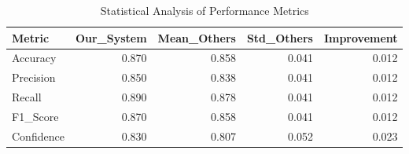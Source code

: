 \begin{table}
\caption{Statistical Analysis of Performance Metrics}
\label{tab:statistical_analysis}
\begin{tabular}{lrrrr}
\toprule
Metric & Our_System & Mean_Others & Std_Others & Improvement \\
\midrule
Accuracy & 0.870 & 0.858 & 0.041 & 0.012 \\
Precision & 0.850 & 0.838 & 0.041 & 0.012 \\
Recall & 0.890 & 0.878 & 0.041 & 0.012 \\
F1_Score & 0.870 & 0.858 & 0.041 & 0.012 \\
Confidence & 0.830 & 0.807 & 0.052 & 0.023 \\
\bottomrule
\end{tabular}
\end{table}
